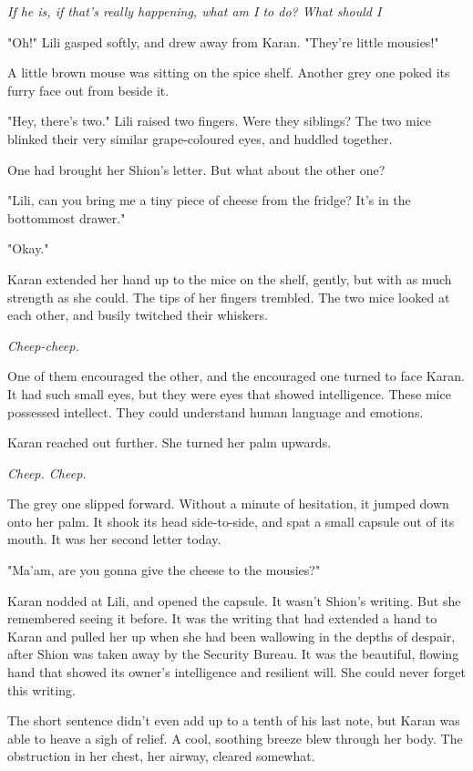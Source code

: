 \emph{If he is, if that's really happening, what am I to do? What should I\el }

"Oh!" Lili gasped softly, and drew away from Karan. "They're little
mousies!"

A little brown mouse was sitting on the spice shelf. Another grey one
poked its furry face out from beside it.

"Hey, there's two." Lili raised two fingers. Were they siblings? The two
mice blinked their very similar grape-coloured eyes, and huddled
together.

One had brought her Shion's letter. But what about the other one?

"Lili, can you bring me a tiny piece of cheese from the fridge? It's in
the bottommost drawer."

"Okay."

Karan extended her hand up to the mice on the shelf, gently, but with as
much strength as she could. The tips of her fingers trembled. The two
mice looked at each other, and busily twitched their whiskers.

\emph{Cheep-cheep.}

One of them encouraged the other, and the encouraged one turned to face
Karan. It had such small eyes, but they were eyes that showed
intelligence. These mice possessed intellect. They could understand
human language and emotions.

Karan reached out further. She turned her palm upwards.

\emph{Cheep. Cheep.}

The grey one slipped forward. Without a minute of hesitation, it jumped
down onto her palm. It shook its head side-to-side, and spat a small
capsule out of its mouth. It was her second letter today.

"Ma'am, are you gonna give the cheese to the mousies?"

Karan nodded at Lili, and opened the capsule. It wasn't Shion's writing.
But she remembered seeing it before. It was the writing that had
extended a hand to Karan and pulled her up when she had been wallowing
in the depths of despair, after Shion was taken away by the Security
Bureau. It was the beautiful, flowing hand that showed its owner's
intelligence and resilient will. She could never forget this writing.


The short sentence didn't even add up to a tenth of his last note, but
Karan was able to heave a sigh of relief. A cool, soothing breeze blew
through her body. The obstruction in her chest, her airway, cleared
somewhat.

